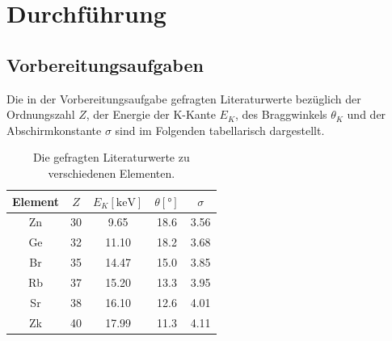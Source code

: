 \section{Durchführung}
\label{sec:Durchführung}
\subsection{Vorbereitungsaufgaben}
\label{sec:vorbereitung}
Die in der Vorbereitungsaufgabe gefragten Literaturwerte bezüglich der Ordnungszahl $Z$, der Energie der K-Kante $E_K$, des Braggwinkels
$\theta_K$ und der Abschirmkonstante $\sigma$ sind im Folgenden tabellarisch dargestellt.
\begin{table}[H]
    \centering
        \caption{Die gefragten Literaturwerte zu verschiedenen Elementen.\cite{AP05}}
        \label{tab:diss11}
        \begin{tabular}{S S[table-format=2.0] S[table-format=2.2] S[table-format=2.1] S}
          \toprule
          {Element} & {$Z$} & {$E_K [\si{\kilo\electronvolt}]$} & {$\theta [\si{\degree}]$} & {$\sigma$}\\
          \midrule
            {Zn} & 30 & 9.65  & 18.6 & 3.56 \\
            {Ge} & 32 & 11.10 & 18.2 & 3.68 \\
            {Br} & 35 & 14.47 & 15.0 & 3.85 \\
            {Rb} & 37 & 15.20 & 13.3 & 3.95 \\
            {Sr} & 38 & 16.10 & 12.6 & 4.01 \\
            {Zk} & 40 & 17.99 & 11.3 & 4.11 \\
          \bottomrule
        \end{tabular}
      \end{table}
